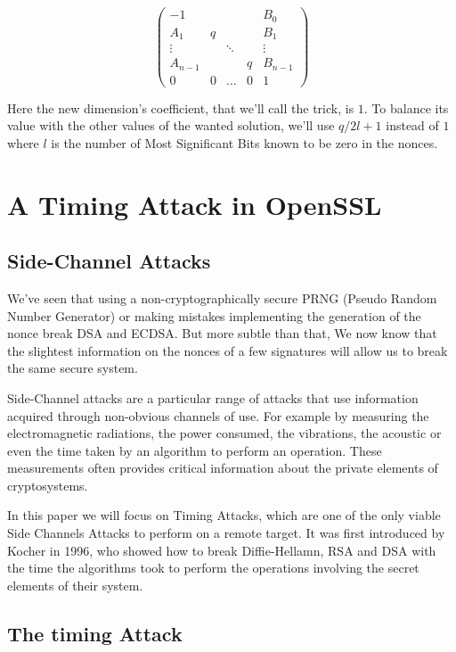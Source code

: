 \documentclass[a4paper,11pt]{article}
\begin{document}
$$
\begin{pmatrix}
-1 & & & & B_0\\
A_1 & q & & & B_1 \\
\vdots & & \ddots & &\vdots \\
A_{n-1} & & & q & B_{n-1}\\
0 & 0 & \hdots & 0 & 1
\end{pmatrix}
$$

Here the new dimension's coefficient, that we'll call the trick, is $1$. To balance its value with the other values of the wanted solution, we'll use $q / 2{l+1}$ instead of $1$ where $l$ is the number of Most Significant Bits known to be zero in the nonces.


\section{A Timing Attack in OpenSSL}

\subsection{Side-Channel Attacks}

We've seen that using a non-cryptographically secure PRNG (Pseudo Random Number Generator) or making mistakes implementing the generation of the nonce break DSA and ECDSA. But more subtle than that, We now know that the slightest information on the nonces of a few signatures will allow us to break the same secure system.

Side-Channel attacks are a particular range of attacks that use information acquired through non-obvious channels of use. For example by measuring the electromagnetic radiations, the power consumed, the vibrations, the acoustic or even the time taken by an algorithm to perform an operation. These measurements often provides critical information about the private elements of cryptosystems.

In this paper we will focus on Timing Attacks, which are one of the only viable Side Channels Attacks to perform on a remote target. It was first introduced by Kocher in 1996\cite{Kocher}, who showed how to break Diffie-Hellamn, RSA and DSA with the time the algorithms took to perform the operations involving the secret elements of their system.

\subsection{The timing Attack}
\end{document}
